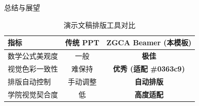 \documentclass{beamer}
\begin{document}
\begin{frame}{总结与展望}

\begin{table}
\centering
\begin{tabular}{lcc}
\hline
\textbf{指标} & \textbf{传统 PPT} & \textbf{ZGCA Beamer (本模板)} \\
\hline
数学公式美观度 & 一般 & \textbf{极佳} \\
视觉色彩一致性 & 难保持 & \textbf{优秀 (适配 \#0363c9)} \\
排版自动控制 & 手动调整 & \textbf{自动排版} \\
学院视觉契合度 & 低 & \textbf{高度适配} \\
\hline
\end{tabular}
\caption{演示文稿排版工具对比}
\end{table}

\end{frame}

\backmatter
\end{document}
